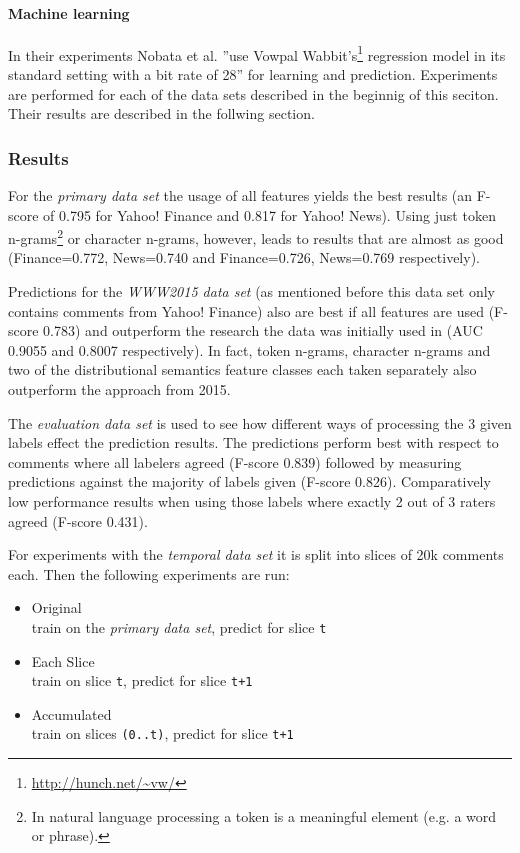 \documentclass{proseminar}
\begin{document}

\paragraph{Machine learning} In their experiments Nobata et al. ''use Vowpal Wabbit's\footnote{\url{http://hunch.net/~vw/}} regression model in its standard setting with a bit rate of 28''\cite{Yahoo:2016} for learning and prediction. Experiments are performed for each of the data sets described in the beginnig of this seciton. Their results are described in the follwing section.

\subsubsection{Results}
For the \emph{primary data set} the usage of all features yields the best results (an F-score of 0.795 for Yahoo! Finance and 0.817 for Yahoo! News). Using just token n-grams\footnote{In natural language processing a token is a meaningful element (e.g. a word or phrase).} or character n-grams, however, leads to results that are almost as good (Finance=0.772, News=0.740 and Finance=0.726, News=0.769 respectively).

Predictions for the \emph{WWW2015 data set} (as mentioned before this data set only contains comments from Yahoo! Finance) also are best if all features are used (F-score 0.783) and outperform the research the data was initially used in\cite{Yahoo:2015} (AUC 0.9055 and 0.8007 respectively). In fact, token n-grams, character n-grams and two of the distributional semantics feature classes each taken separately also outperform the approach from 2015.

The \emph{evaluation data set} is used to see how different ways of processing the 3 given labels effect the prediction results. The predictions perform best with respect to comments where all labelers agreed (F-score 0.839) followed by measuring predictions against the majority of labels given (F-score 0.826). Comparatively low performance results when using those labels where exactly 2 out of 3 raters agreed (F-score 0.431).

For experiments with the \emph{temporal data set} it is split into slices of 20k comments each. Then the following experiments are run:
\begin{itemize}
\item \lbrack Original\rbrack\\train on the \emph{primary data set}, predict for slice \texttt{t}
\item \lbrack Each Slice\rbrack\\train on slice \texttt{t}, predict for slice \texttt{t+1}
\item \lbrack Accumulated\rbrack\\train on slices \texttt{(0..t)}, predict for slice \texttt{t+1}
\end{itemize}
\end{document}
